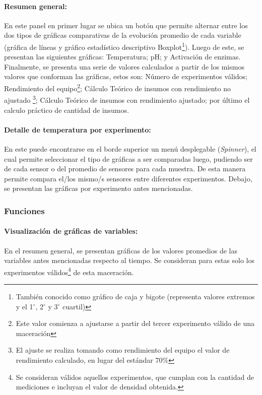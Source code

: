             \paragraph{Resumen general:} En este panel en primer lugar se ubica un botón que permite alternar entre los dos tipos de gráficas comparativas de la evolución promedio de cada variable (gráfica de líneas y gráfico estadístico descriptivo Boxplot\footnote{También conocido como gráfico de caja y bigote (representa valores extremos y el 1$^{\circ}$, 2$^{\circ}$ y 3$^{\circ}$ cuartil)}). Luego de este, se presentan las siguientes gráficas: Temperatura; pH; y Activación de enzimas. Finalmente, se presenta una serie de valores calculados a partir de los mismos valores que conforman las gráficas, estos son: Número de experimentos válidos; Rendimiento del equipo\footnote{Este valor comienza a ajustarse a partir del tercer experimento válido de una maceración}; Cálculo Teórico de insumos con rendimiento no ajustado \footnote{El ajuste se realiza tomando como rendimiento del equipo el valor de rendimiento calculado, en lugar del estándar 70\%}; Cálculo Teórico de insumos con rendimiento ajustado; por último el calculo práctico de cantidad de insumos. 
            
            \paragraph{Detalle de temperatura por experimento:} En este puede encontrarse en el borde superior un menú desplegable (\textit{Spinner}), el cual permite seleccionar el tipo de gráficas a ser comparadas luego, pudiendo ser de cada sensor o del promedio de sensores para cada muestra. De esta manera permite compara el/los mismo/s sensores entre diferentes experimentos. Debajo, se presentan las gráficas por experimento antes mencionadas.
            
            \subsubsection{Funciones}
            \paragraph{Visualización de gráficas de variables:}
              En el resumen general, se presentan gráficas de los valores promedios de las variables antes mencionadas respecto al tiempo. Se consideran para estas solo los experimentos válidos\footnote{Se consideran válidos aquellos experimentos, que cumplan con la cantidad de mediciones e incluyan el valor de densidad obtenida.} de esta maceración.
            
